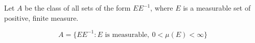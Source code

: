 Let $A$ be the class of all sets of the form $EE^{-1}$, where $E$ is a measurable set of positive, finite measure.

$$A = \{EE^{-1} : E \text{ is measurable}, \ 0 < \mu(E) < \infty\}$$
